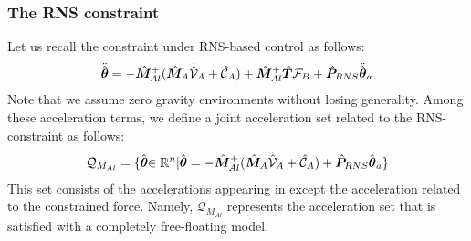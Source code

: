 \subsubsection{The RNS constraint}
Let us recall the constraint under RNS-based control as follows:
%
\begin{align}
  {\ddot{\hat{\bm{\theta}}}} = -{\hat{\bm{M}}}_{Al}^{+}({\hat{\bm{M}}}_{A}\dot{\hat{\mathcal{V}}}_{A} + \hat{\mathcal{C}}_{A}) +
  {\hat{\bm{M}}}_{Al}^{+}{\hat{\bm{T}}}\mathcal{F}_{B} + {\hat{\bm{P}}}_{RNS}{\ddot{\hat{\bm{\theta}}}}_{a}\label{eq:RNS_CONST_ACC}
\end{align}
%
Note that we assume zero gravity environments without losing generality.
Among these acceleration terms,
we define a joint acceleration set related to the RNS-constraint as follows:
%
\begin{align}
  \mathcal{Q}_{M_{Al}} = \{{\ddot{\hat{\bm{\theta}}}}{\in\mathbb{R}^{n}}| 
  {\ddot{\hat{\bm{\theta}}}} = -{\hat{\bm{M}}}_{Al}^{+}({\hat{\bm{M}}}_{A}\dot{\hat{\mathcal{V}}}_{A} + \hat{\mathcal{C}}_{A}) + {\hat{\bm{P}}}_{RNS}{\ddot{\hat{\bm{\theta}}}}_{a}\}
\end{align}
%
This set consists of the accelerations appearing in  except
the acceleration related to the constrained force.
Namely, $\mathcal{Q}_{M_{Al}}$ represents the acceleration set that is satisfied with
a completely free-floating model.

